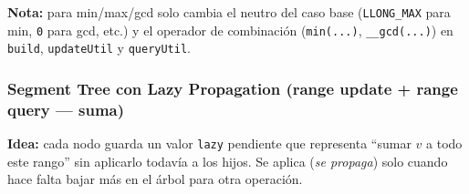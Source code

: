 \documentclass[10pt,a4paper,twocolumn]{article}
\begin{document}
\textbf{Nota:} para min/max/gcd solo cambia el neutro del caso base
(\texttt{LLONG\_MAX} para min, \texttt{0} para gcd, etc.) y el
operador de combinación (\texttt{min(...)}, \texttt{\_\_gcd(...)}) en
\texttt{build}, \texttt{updateUtil} y \texttt{queryUtil}.


\subsubsection{Segment Tree con Lazy Propagation (range update + range query — suma)}

\textbf{Idea:} cada nodo guarda un valor \texttt{lazy} pendiente que
representa ``sumar $v$ a todo este rango'' sin aplicarlo todavía a
los hijos. Se aplica (\emph{se propaga}) solo cuando hace falta bajar
más en el árbol para otra operación.
\end{document}
